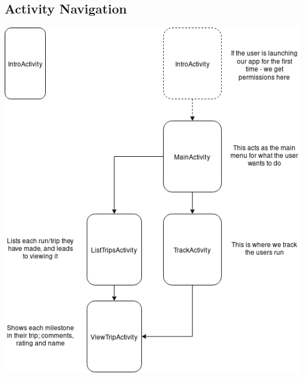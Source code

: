 \documentclass[11pt]{article}
\begin{document}
\subsection{Activity Navigation}
\includegraphics[width=\linewidth]{activities_navigation}
\end{document}
